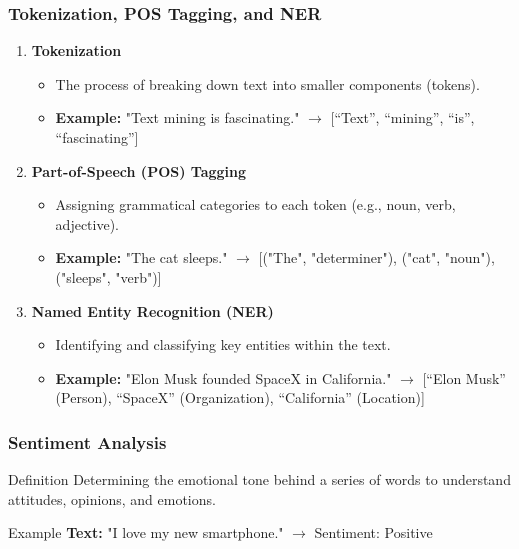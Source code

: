 \documentclass[aspectratio=169]{beamer}
\begin{document}
\begin{frame}[fragile]
    \frametitle{Tokenization, POS Tagging, and NER}
    \begin{enumerate}
        \item \textbf{Tokenization}
        \begin{itemize}
            \item The process of breaking down text into smaller components (tokens).
            \item \textbf{Example:} "Text mining is fascinating." $\rightarrow$ [“Text”, “mining”, “is”, “fascinating”]
        \end{itemize}
        
        \item \textbf{Part-of-Speech (POS) Tagging}
        \begin{itemize}
            \item Assigning grammatical categories to each token (e.g., noun, verb, adjective).
            \item \textbf{Example:} "The cat sleeps." $\rightarrow$ [("The", "determiner"), ("cat", "noun"), ("sleeps", "verb")]
        \end{itemize}
        
        \item \textbf{Named Entity Recognition (NER)}
        \begin{itemize}
            \item Identifying and classifying key entities within the text.
            \item \textbf{Example:} "Elon Musk founded SpaceX in California." $\rightarrow$ [“Elon Musk” (Person), “SpaceX” (Organization), “California” (Location)]
        \end{itemize}
    \end{enumerate}
\end{frame}

\begin{frame}[fragile]
    \frametitle{Sentiment Analysis}
    \begin{block}{Definition}
        Determining the emotional tone behind a series of words to understand attitudes, opinions, and emotions.
    \end{block}
    \begin{block}{Example}
        \textbf{Text:} "I love my new smartphone." $\rightarrow$ Sentiment: Positive
    \end{block}
\end{frame}
\end{document}

